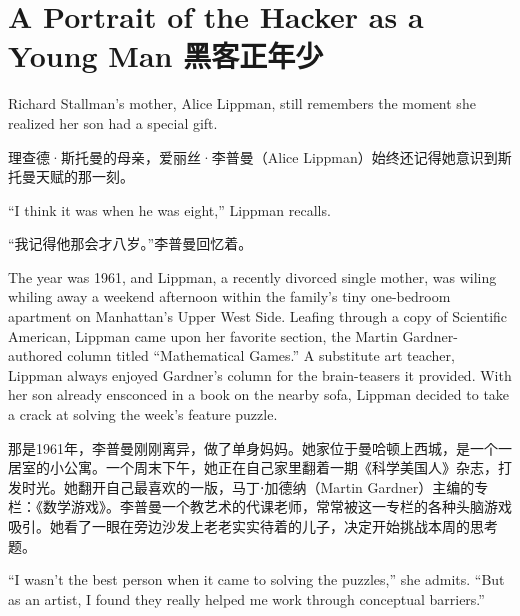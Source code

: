 \chapter{\ifdefined\eng
A Portrait of the Hacker as a Young Man
\fi
\ifdefined\chs
黑客正年少
\fi}
\ifdefined\eng
{}
\fi
\thispagestyle{empty}
\ifdefined\eng
Richard Stallman's mother, Alice Lippman, still remembers the moment she realized her son had a special gift.
\fi

\ifdefined\chs
理查德·斯托曼的母亲，爱丽丝·李普曼（Alice Lippman）始终还记得她意识到斯托曼天赋的那一刻。
\fi

\ifdefined\eng
``I think it was when he was eight,'' Lippman recalls.
\fi

\ifdefined\chs
``我记得他那会才八岁。''李普曼回忆着。
\fi

\ifdefined\eng
The year was 1961, and Lippman, a recently divorced single mother, was \ifdefined\vone wiling \fi\ifdefined\vtwo whiling \fi away a weekend afternoon within the family's tiny one-bedroom apartment on Manhattan's Upper West Side. Leafing through a copy of Scientific American, Lippman came upon her favorite section, the Martin Gardner-authored column titled ``Mathematical Games.'' A substitute art teacher, Lippman always enjoyed Gardner's column for the brain-teasers it provided. With her son already ensconced in a book on the nearby sofa, Lippman decided to take a crack at solving the week's feature puzzle.
\fi

\ifdefined\chs
那是1961年，李普曼刚刚离异，做了单身妈妈。她家位于曼哈顿上西城，是一个一居室的小公寓。一个周末下午，她正在自己家里翻着一期《科学美国人》杂志，打发时光。她翻开自己最喜欢的一版，马丁⋅加德纳（Martin Gardner）主编的专栏：《数学游戏》。李普曼一个教艺术的代课老师，常常被这一专栏的各种头脑游戏吸引。她看了一眼在旁边沙发上老老实实待着的儿子，决定开始挑战本周的思考题。
\fi

\ifdefined\eng
``I wasn't the best person when it came to solving the puzzles,'' she admits. ``But as an artist, I found they really helped me work through conceptual barriers.''
\fi

